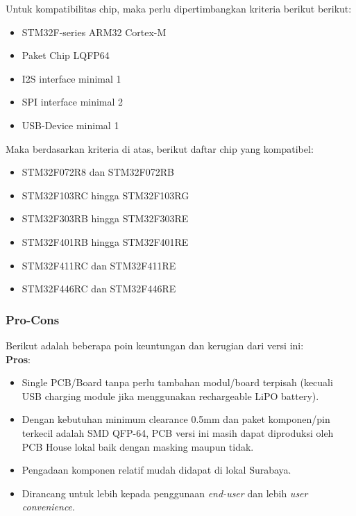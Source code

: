 \documentclass[12pt,]{article}
\begin{document}
	Untuk kompatibilitas chip, maka perlu dipertimbangkan kriteria berikut berikut:
	\begin{itemize}
		\item STM32F-series ARM32 Cortex-M
		\item Paket Chip LQFP64
		\item I2S interface minimal 1
		\item SPI interface minimal 2
		\item USB-Device minimal 1
	\end{itemize}

	Maka berdasarkan kriteria di atas, berikut daftar chip yang kompatibel:
	\begin{itemize}
		\item STM32F072R8 dan STM32F072RB
		\item STM32F103RC hingga STM32F103RG
		\item STM32F303RB hingga STM32F303RE
		\item STM32F401RB hingga STM32F401RE
		\item STM32F411RC dan STM32F411RE 
		\item STM32F446RC dan STM32F446RE
	\end{itemize}
	
	\newpage
	\subsubsection{Pro-Cons}
	Berikut adalah beberapa poin keuntungan dan kerugian dari versi ini:\\
	
	\textbf{Pros}:
	\begin{itemize}
		\item Single PCB/Board tanpa perlu tambahan modul/board terpisah
		(kecuali USB charging module jika menggunakan rechargeable LiPO battery).
		
		\item Dengan kebutuhan minimum clearance 0.5mm dan paket komponen/pin terkecil adalah SMD QFP-64,
		PCB versi ini masih dapat diproduksi oleh PCB House lokal baik dengan masking maupun tidak.
		
		\item Pengadaan komponen relatif mudah didapat di lokal Surabaya.
		
		\item Dirancang untuk lebih kepada penggunaan \textit{end-user} dan lebih \textit{user convenience}.
	\end{itemize}
	
\end{document}
